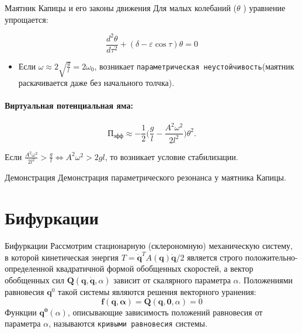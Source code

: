 \documentclass{beamer}
\begin{document}
\begin{frame}{Маятник Капицы и его законы движения}
    Для малых колебаний ($\theta$ ) уравнение упрощается:
    
    \[ \frac{d^2\theta}{d\tau^2}+(\delta-\varepsilon\cos{\tau})\theta=0 \]
    
    \begin{itemize}
        \item Если $\omega\approx 2\sqrt{\frac{g}{l}}=2\omega_0$, возникает \texttt{параметрическая неустойчивость}(маятник раскачивается даже без начального толчка).
    \end{itemize}

    \paragraph{Виртуальная потенциальная яма:}
    \[ \text{П}_{\text{эфф}}\approx-\frac{1}{2}\Big(\frac{g}{l}-\frac{A^2\omega^2}{2l^2}\Big)\theta^2. \]

    Если $\frac{A^2\omega^2}{2l^2}>\frac{g}{l}\Leftrightarrow A^2\omega^2>2gl$, то возникает условие стабилизации.
    
\end{frame}

\begin{frame}{Демонстрация}
    Демонстрация параметрического резонанса у маятника Капицы.
\end{frame}

\section{Бифуркации}
\begin{frame}{Бифуркации}
    Рассмотрим стационарную (склерономную) механическую систему, в которой кинетическая энергия $T=\dot{\mathbf{q}}^TA(\mathbf{q})\dot{\mathbf{q}}/2$ является строго положительно-определенной квадратичной формой обобщенных скоростей, а вектор обобщенных сил $\mathbf{Q}(\mathbf{q}, \dot{\mathbf{q}}, \alpha)$ зависит от скалярного параметра $\alpha$. Положениями равновесия $\mathbf{q}^0$ такой системы являются решения векторного уранения:
    $$
    \mathbf{f(\mathbf{q}, \alpha)}=\mathbf{Q}(\mathbf{q}, \mathbf{0}, \alpha)=0
    $$
    Функции $\mathbf{q^0}(\alpha)$, описывающие зависимость положений равновесия от параметра $\alpha$, называются \texttt{кривыми равновесия} системы.
\end{frame}
\end{document}
